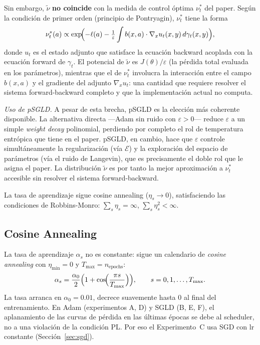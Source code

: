 \documentclass[11pt, a4paper]{article}
\theoremstyle{definition}
\begin{document}
Sin embargo, $\tilde{\nu}$ \textbf{no coincide} con la medida de control
óptima $\nu^*_t$ del paper. Según la condición de primer orden
(principio de Pontryagin), $\nu^*_t$ tiene la forma
\begin{equation}
  \nu^*_t(a) \propto \exp\!\Bigl(-\ell(a)
  - \tfrac{1}{\varepsilon}\int b(x,a)\cdot\nabla_x u_t(x,y)\,d\gamma_t(x,y)\Bigr),
\end{equation}
donde $u_t$ es el estado adjunto que satisface la ecuación backward acoplada
con la ecuación forward de $\gamma_t$. El potencial de $\tilde{\nu}$ es
$J(\theta)/\varepsilon$ (la pérdida total evaluada en los parámetros), mientras
que el de $\nu^*_t$ involucra la interacción entre el campo $b(x,a)$ y el
gradiente del adjunto $\nabla_x u_t$: una cantidad que requiere resolver el
sistema forward-backward completo y que la implementación actual no computa.

\textit{Uso de pSGLD.} A pesar de esta brecha,
pSGLD es la elección más coherente disponible.
La alternativa directa ---Adam sin ruido con $\varepsilon > 0$--- reduce
$\varepsilon$ a un simple \emph{weight decay} polinomial, perdiendo por
completo el rol de temperatura entrópica que tiene en el paper.
pSGLD, en cambio, hace que $\varepsilon$ controle simultáneamente la
regularización (vía $\mathcal{E}$) y la exploración del espacio de parámetros
(vía el ruido de Langevin), que es precisamente el doble rol que le asigna
el paper. La distribución $\tilde{\nu}$ es por tanto la mejor aproximación
a $\nu^*_t$ accesible sin resolver el sistema forward-backward.

La tasa de aprendizaje sigue cosine annealing ($\eta_s \to 0$), satisfaciendo
las condiciones de Robbins-Monro: $\sum_s \eta_s = \infty$,
$\sum_s \eta_s^2 < \infty$.

\subsection{Cosine Annealing}
\label{sec:cosine}

La tasa de aprendizaje $\alpha_s$ no es constante: sigue un calendario de
\emph{cosine annealing} \cite{loshchilov2017sgdr} con $\eta_{\min} = 0$ y
$T_{\max} = n_\text{epochs}$:
\begin{equation}
  \alpha_s = \frac{\alpha_0}{2}\Bigl(1 + \cos\!\Bigl(\frac{\pi s}{T_{\max}}\Bigr)\Bigr),
  \qquad s = 0, 1, \ldots, T_{\max}.
\end{equation}
La tasa arranca en $\alpha_0 = 0.01$, decrece suavemente hasta $0$ al final
del entrenamiento. En Adam (experimentos A, D) y SGLD (B, E, F), el
aplanamiento de las curvas de pérdida en las últimas épocas se debe al
scheduler, no a una violación de la condición PL. Por eso el Experimento~C
usa SGD con lr constante (Sección~\ref{sec:sgd}).
\end{document}
